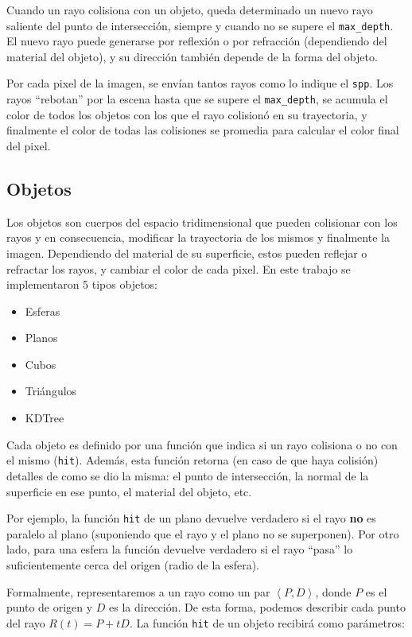 Cuando un rayo colisiona con un objeto, queda determinado un nuevo rayo saliente
del punto de intersección, siempre y cuando no se supere el \texttt{max\_depth}.
El nuevo rayo puede generarse por reflexión o por refracción (dependiendo del
material del objeto), y su dirección también depende de la forma del objeto.

Por cada pixel de la imagen, se envían tantos rayos como lo indique el
\texttt{spp}. Los rayos ``rebotan'' por la escena hasta que se supere el
\texttt{max\_depth}, se acumula el color de todos los objetos con los que el
rayo colisionó en su trayectoria, y finalmente el color de todas las colisiones
se promedia para calcular el color final del pixel.

\subsection{Objetos}

Los objetos son cuerpos del espacio tridimensional que pueden colisionar con los
rayos y en consecuencia, modificar la trayectoria de los mismos y finalmente la
imagen. Dependiendo del material de su superficie, estos pueden reflejar o
refractar los rayos, y cambiar el color de cada pixel. En este trabajo se
implementaron 5 tipos objetos:

\begin{itemize}
  \item Esferas
  \item Planos
  \item Cubos
  \item Triángulos
  \item KDTree
\end{itemize}

Cada objeto es definido por una función que indica si un rayo colisiona o no con
el mismo (\texttt{hit}). Además, esta función retorna (en caso de que haya
colisión) detalles de como se dio la misma: el punto de intersección, la normal
de la superficie en ese punto, el material del objeto, etc.

Por ejemplo, la función \texttt{hit} de un plano devuelve verdadero si el rayo
\textbf{no} es paralelo al plano (suponiendo que el rayo y el plano no se
superponen). Por otro lado, para una esfera la función devuelve verdadero si el
rayo ``pasa'' lo suficientemente cerca del origen (radio de la esfera).

Formalmente, representaremos a un rayo como un par $\left\langle P, D
  \right\rangle$, donde $P$ es el punto de origen y $D$ es la dirección. De esta
forma, podemos describir cada punto del rayo $R(t) = P + tD$. La función
\texttt{hit} de un objeto recibirá como parámetros:

